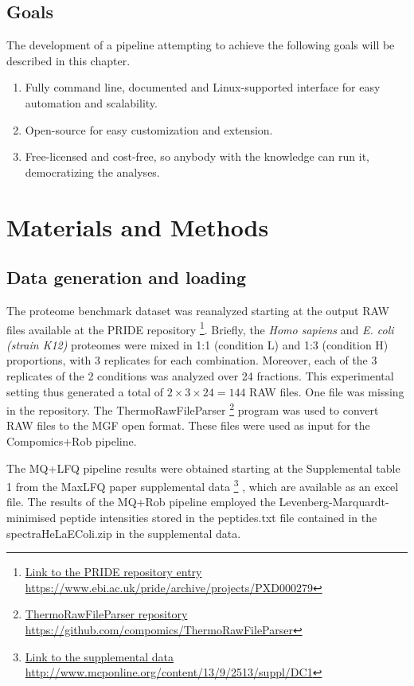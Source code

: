 \subsection{Goals}

The development of a pipeline attempting to achieve the following goals will be described in this chapter.

\begin{enumerate}

\item Fully command line, documented and Linux-supported interface for easy automation and scalability.
\item Open-source for easy customization and extension.
\item Free-licensed and cost-free, so anybody with the knowledge can run it, democratizing the analyses.
\end{enumerate}

\section{Materials and Methods}

\subsection{Data generation and loading}

The proteome benchmark dataset \cite{Cox2014} was reanalyzed starting at the output RAW files available at the PRIDE repository \footnote{\href{https://www.ebi.ac.uk/pride/archive/projects/PXD000279}{Link to the PRIDE repository entry https://www.ebi.ac.uk/pride/archive/projects/PXD000279}}. Briefly, the \textit{Homo sapiens} and \textit{E. coli (strain K12)} proteomes were mixed in 1:1 (condition L) and 1:3 (condition H) proportions, with 3 replicates for each combination. Moreover, each of the 3 replicates of the 2 conditions was analyzed over 24 fractions. This experimental setting thus generated a total of $2 \times 3 \times 24=144$ RAW files. One file was missing in the repository. The ThermoRawFileParser \footnote{\href{https://github.com/compomics/ThermoRawFileParser}{ThermoRawFileParser repository https://github.com/compomics/ThermoRawFileParser}} program was used to convert RAW files to the MGF open format. These files were used as input for the Compomics+Rob pipeline.

The MQ+LFQ pipeline results were obtained starting at the Supplemental table 1 from the MaxLFQ paper supplemental data \footnote{\href{http://www.mcponline.org/content/13/9/2513/suppl/DC1}{Link to the supplemental data http://www.mcponline.org/content/13/9/2513/suppl/DC1}} \cite{Cox2014}, which are available as an excel file. The results of the MQ+Rob pipeline employed the Levenberg-Marquardt-minimised peptide intensities stored in the peptides.txt file contained in the spectraHeLaEColi.zip in the supplemental data.

